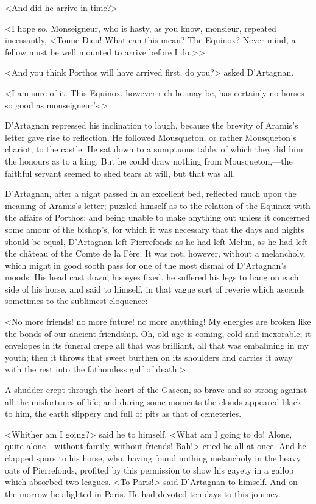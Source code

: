 <And did he arrive in time?>

<I hope so. Monseigneur, who is hasty, as you know, monsieur, repeated incessantly, <Tonne Dieu! What can this mean? The Equinox? Never mind, a fellow must be well mounted to arrive before I do.>>

<And you think Porthos will have arrived first, do you?> asked D'Artagnan.

<I am sure of it. This Equinox, however rich he may be, has certainly no horses so good as monseigneur's.>

D'Artagnan repressed his inclination to laugh, because the brevity of Aramis's letter gave rise to reflection. He followed Mousqueton, or rather Mousqueton's chariot, to the castle. He sat down to a sumptuous table, of which they did him the honours as to a king. But he could draw nothing from Mousqueton,—the faithful servant seemed to shed tears at will, but that was all.

D'Artagnan, after a night passed in an excellent bed, reflected much upon the meaning of Aramis's letter; puzzled himself as to the relation of the Equinox with the affairs of Porthos; and being unable to make anything out unless it concerned some amour of the bishop's, for which it was necessary that the days and nights should be equal, D'Artagnan left Pierrefonds as he had left Melun, as he had left the château of the Comte de la Fère. It was not, however, without a melancholy, which might in good sooth pass for one of the most dismal of D'Artagnan's moods. His head cast down, his eyes fixed, he suffered his legs to hang on each side of his horse, and said to himself, in that vague sort of reverie which ascends sometimes to the sublimest eloquence:

<No more friends! no more future! no more anything! My energies are broken like the bonds of our ancient friendship. Oh, old age is coming, cold and inexorable; it envelopes in its funeral crepe all that was brilliant, all that was embalming in my youth; then it throws that sweet burthen on its shoulders and carries it away with the rest into the fathomless gulf of death.>

A shudder crept through the heart of the Gascon, so brave and so strong against all the misfortunes of life; and during some moments the clouds appeared black to him, the earth slippery and full of pits as that of cemeteries.

<Whither am I going?> said he to himself. <What am I going to do! Alone, quite alone—without family, without friends! Bah!> cried he all at once. And he clapped spurs to his horse, who, having found nothing melancholy in the heavy oats of Pierrefonds, profited by this permission to show his gayety in a gallop which absorbed two leagues. <To Paris!> said D'Artagnan to himself. And on the morrow he alighted in Paris. He had devoted ten days to this journey. 